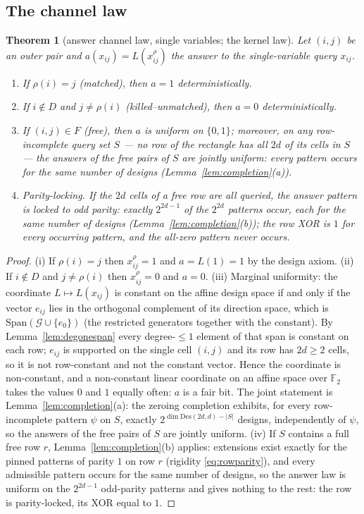 \documentclass[11pt]{article}
\newtheorem{theorem}{Theorem}[section]
\theoremstyle{definition}
\theoremstyle{remark}
\newcommand{\F}{\mathbb{F}}
\newcommand{\Des}{\mathrm{Des}}
\newcommand{\Sp}{\mathrm{Span}}
\begin{document}
\subsection{The channel law}

\begin{theorem}[answer channel law, single variables; the kernel
law]\label{thm:channel}
Let $(i,j)$ be an outer pair and $a(x_{ij})=L(x_{ij}^\rho)$ the answer to
the single-variable query $x_{ij}$.
\begin{enumerate}
\item[(i)] If $\rho(i)=j$ (matched), then $a=1$ deterministically.
\item[(ii)] If $i\notin D$ and $j\ne\rho(i)$ (killed--unmatched), then
$a=0$ deterministically.
\item[(iii)] If $(i,j)\in F$ (free), then $a$ is uniform on $\{0,1\}$;
moreover, on any \emph{row-incomplete} query set $S$ --- no row of the
rectangle has all $2d$ of its cells in $S$ --- the answers of the free
pairs of $S$ are jointly uniform: every pattern occurs for the same
number of designs (Lemma~\ref{lem:completion}(a)).
\item[(iv)] \emph{Parity-locking.}  If the $2d$ cells of a free row are
all queried, the answer pattern is locked to odd parity: exactly
$2^{2d-1}$ of the $2^{2d}$ patterns occur, each for the same number of
designs (Lemma~\ref{lem:completion}(b)); the row XOR is $1$ for every
occurring pattern, and the all-zero pattern never occurs.
\end{enumerate}
\end{theorem}

\begin{proof}
(i) If $\rho(i)=j$ then $x_{ij}^\rho=1$ and $a=L(1)=1$ by the design
axiom.  (ii) If $i\notin D$ and $j\ne\rho(i)$ then $x_{ij}^\rho=0$ and
$a=0$.  (iii) Marginal uniformity: the coordinate $L\mapsto L(x_{ij})$ is
constant on the affine design space if and only if the vector
$e_{ij}$ lies in the orthogonal complement of its direction space,
which is $\Sp(\mathcal{G}\cup\{e_0\})$ (the restricted generators
together with the constant).  By
Lemma~\ref{lem:degonespan} every degree-$\le1$ element of that span is
constant on each row; $e_{ij}$ is supported on the single cell $(i,j)$
and its row has $2d\ge2$ cells, so it is not row-constant and not the
constant vector.  Hence the coordinate is non-constant, and a
non-constant linear coordinate on an affine space over $\F_2$ takes the
values $0$ and $1$ equally often: $a$ is a fair bit.  The joint
statement is Lemma~\ref{lem:completion}(a): the zeroing completion
exhibits, for every row-incomplete pattern $\psi$ on $S$, exactly
$2^{\dim\Des(2d,d)-|S|}$ designs, independently of $\psi$, so the
answers of the free pairs of $S$ are jointly uniform.  (iv) If $S$
contains a full free row $r$, Lemma~\ref{lem:completion}(b) applies:
extensions exist exactly for the pinned patterns of parity $1$ on row
$r$ (rigidity \eqref{eq:rowparity}), and every admissible pattern
occurs for the same number of designs, so the answer law is uniform on
the $2^{2d-1}$ odd-parity patterns and gives nothing to the rest: the
row is parity-locked, its XOR equal to $1$.
\end{proof}
\end{document}
